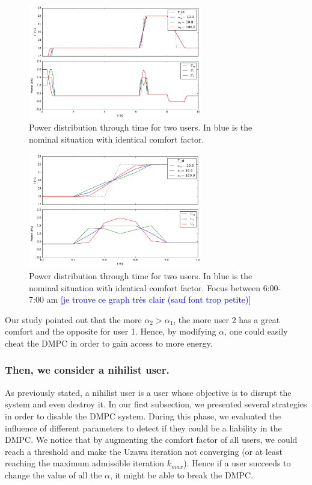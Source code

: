 \documentclass[conference]{IEEEtran}
\edef\hc{\string:}
\newcommand{\rem}[1]{\textcolor{blue}{[#1]}}
\begin{document}
\begin{figure}[H]
\centering
\includegraphics[width=3in]{DMPCalp.pdf}
\caption{Power distribution through time for two users. In blue is the nominal situation with identical comfort factor.}
\label{DMPCa_1}
\end{figure}

\begin{figure}[H]
\centering
\includegraphics[width=3in]{DMPCalpZ.pdf}
\caption{Power distribution through time for two users. In blue is the nominal situation with identical comfort factor. Focus between 6\hc 00-7\hc 00 am
\rem{je trouve ce graph très clair (sauf font trop petite)}
}
\label{DMPCa_2}
\end{figure}

Our study pointed out that the more $\alpha_2 > \alpha_1$, the more user 2 has a great comfort and the opposite for user 1. Hence, by modifying $\alpha$, one could easily cheat the DMPC in order to gain access to more energy.


\subsubsection{Then, we consider a nihilist user.}
As previously stated, a nihilist user is a user whose objective is to disrupt the system and even destroy it. In our first subsection, we presented several strategies in order to disable the DMPC system.  During this phase, we evaluated the influence of different parameters to detect if they could be a liability in the DMPC. We notice that by augmenting the comfort factor of all users, we could reach a threshold and make the Uzawa iteration not converging (or at least reaching the maximum admissible iteration $k_{max}$). Hence if a user succeeds to change the value of all the $\alpha$, it might be able to break the DMPC. 
\end{document}
